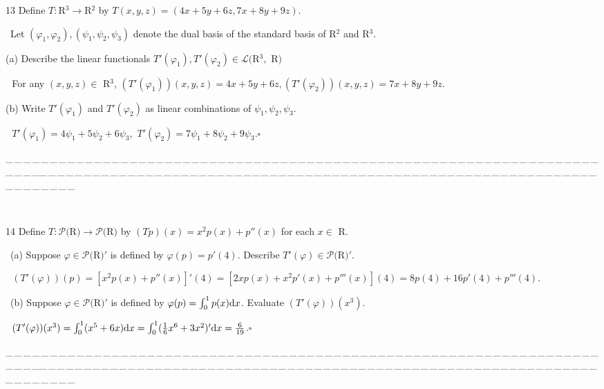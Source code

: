 \documentclass[a4paper, 11pt, UTF8]{article}
\def\d{\textup{d}}
\def\Lm{\mathcal{L}}
\def\Po{\mathcal{P}}
\begin{document}
\begin{large}
{\timesbf\Large 13} {\timessl\Large
Define $T:${\timesbf R}$^3\rightarrow${\timesbf R}$^2$ by $T(x,y,z)=(4x+5y+6z,7x+8y+9z)$.}\par\quad\,
{\timessl\Large Let $(\varphi_1,\varphi_2),(\psi_1,\psi_2,\psi_3)$ denote the dual basis of the standard basis of {\timesbf R}$^2$ and {\timesbf R}$^3$.}\par\quad
(a) {\timessl\Large Describe the linear functionals $T'(\varphi_1),T'(\varphi_2)\in\Lm(${\timesbf R}$^3,$ {\timesbf R}$)$}\par\qquad\,\,
For any $(x,y,z)\in$ {\timesbf R}$^3$, $(T'(\varphi_1))(x,y,z)=4x+5y+6z, (T'(\varphi_2))(x,y,z)=7x+8y+9z$.\par\quad
(b) {\timessl\Large Write $T'(\varphi_1)$ and $T'(\varphi_2)$ as linear combinations of $\psi_1,\psi_2,\psi_3$.
}\par\qquad\,\,
$T'(\varphi_1)=4\psi_1+5\psi_2+6\psi_3,\,\,
T'(\varphi_2)=7\psi_1+8\psi_2+9\psi_3$.\qquad\qquad\qquad\qquad\qquad\qquad\qquad\qquad$\square$
\par

{\tiny \_\,\_\,\_\,\_\,\_\,\_\,\_\,\_\,\_\,\_\,\_\,\_\,\_\,\_\,\_\,\_\,\_\,\_\,\_\,\_\,\_\,\_\,\_\,\_\,\_\,\_\,\_\,\_\,\_\,\_\,\_\,\_\,\_\,\_\,\_\,\_\,\_\,\_\,\_\,\_\,\_\,\_\,\_\,\_\,\_\,\_\,\_\,\_\,\_\,\_\,\_\,\_\,\_\,\_\,\_\,\_\,\_\,\_\,\_\,\_\,\_\,\_\,\_\,\_\,\_\,\_\,\_\,\_\,\_\,\_\,\_\_\,\_\,\_\,\_\,\_\,\_\,\_\,\_\,\_\,\_\,\_\,\_\,\_\,\_\,\_\,\_\,\_\,\_\,\_\,\_\,\_\,\_\,\_\,\_\,\_\,\_\,\_\,\_\,\_\,\_\,\_\,\_\,\_\,\_\,\_\,\_\,\_\,\_\,\_\,\_\,\_\,\_\,\_\,\_\,\_\,\_\,\_\,\_\,\_\,\_\,\_\,\_\,\_\,\_\,\_\,\_\,\_\,\_\,\_\,\_\,\_\,\_\,\_\,\_\,\_\,\_\,\_\,\_\,\_\,\_\,\_}{\tiny\,\par}

{\timesbf\Large 14} {\timessl\Large
Define $T:\Po(${\timesbf R}$)\rightarrow\Po(${\timesbf R}$)$ by $(Tp)(x)=x^2 p(x)+p''(x)$ for each $x\in$ {\timesbf R}.}\par\quad\,
(a) {\timessl Suppose $\varphi\in\Po(${\timesbf R}$)'$ is defined by $\varphi(p)=p'(4)$. Describe $T'(\varphi)\in\Po(${\timesbf R}$)'$.}\par\qquad\,\,
$(T'(\varphi))(p)=[x^2p(x)+p''(x)]'(4)=[2xp(x)+x^2p'(x)+p'''(x)](4)=8p(4)+16p'(4)+p'''(4)$.
\par\quad\,
(b) {\timessl Suppose $\varphi\in\Po(${\timesbf R}$)'$ is defined by
$\varphi(p)=\int_0^1 p(x)\d x$. Evaluate $(T'(\varphi))(x^3)$.}\par\qquad\,\,
$(T'(\varphi))(x^3)=\int_0^1(x^5+6x)\d x=\int_0^1(\frac{1}{6}x^6+3x^2)'\d x=\frac{6}{19}$.\qquad\qquad\qquad\qquad\qquad\qquad\qquad\qquad$\square$
\par
{\tiny \_\,\_\,\_\,\_\,\_\,\_\,\_\,\_\,\_\,\_\,\_\,\_\,\_\,\_\,\_\,\_\,\_\,\_\,\_\,\_\,\_\,\_\,\_\,\_\,\_\,\_\,\_\,\_\,\_\,\_\,\_\,\_\,\_\,\_\,\_\,\_\,\_\,\_\,\_\,\_\,\_\,\_\,\_\,\_\,\_\,\_\,\_\,\_\,\_\,\_\,\_\,\_\,\_\,\_\,\_\,\_\,\_\,\_\,\_\,\_\,\_\,\_\,\_\,\_\,\_\,\_\,\_\,\_\,\_\,\_\,\_\_\,\_\,\_\,\_\,\_\,\_\,\_\,\_\,\_\,\_\,\_\,\_\,\_\,\_\,\_\,\_\,\_\,\_\,\_\,\_\,\_\,\_\,\_\,\_\,\_\,\_\,\_\,\_\,\_\,\_\,\_\,\_\,\_\,\_\,\_\,\_\,\_\,\_\,\_\,\_\,\_\,\_\,\_\,\_\,\_\,\_\,\_\,\_\,\_\,\_\,\_\,\_\,\_\,\_\,\_\,\_\,\_\,\_\,\_\,\_\,\_\,\_\,\_\,\_\,\_\,\_\,\_\,\_\,\_\,\_\,\_}\par


\end{large}
\end{document}

